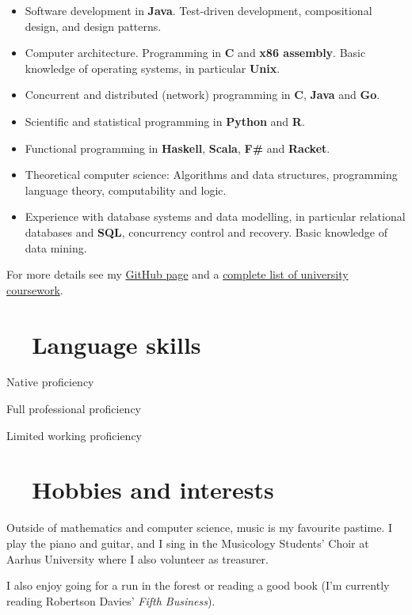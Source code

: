 \documentclass[article, a4paper, 11pt, oneside]{memoir}
\begin{document}
\newcommand{\lan}[1]{\textsf{\textbf{\textcolor{linkcolor}{#1}}}}

\begin{itemize}[itemsep=0em,label={\faAngleDoubleRight}]
    \item Software development in \lan{Java}. Test-driven development, compositional design, and design patterns.
    
    \item Computer architecture. Programming in \lan{C} and \lan{x86 assembly}. Basic knowledge of operating systems, in particular \lan{Unix}.
    
    \item Concurrent and distributed (network) programming in \lan{C}, \lan{Java} and \lan{Go}.

    \item Scientific and statistical programming in \lan{Python} and \lan{R}.
    
    \item Functional programming in \lan{Haskell}, \lan{Scala}, \lan{F\#} and \lan{Racket}.
    
    \item Theoretical computer science: Algorithms and data structures, programming language theory, computability and logic.
    
    \item Experience with database systems and data modelling, in particular relational databases and \lan{SQL}, concurrency control and recovery. Basic knowledge of data mining.
\end{itemize}
%
For more details see my \href{https://github.com/dnhansen/}{GitHub page} and a \href{https://dnhansen.github.io/coursework}{complete list of university coursework}.


\section[Language skills]{\faBook~~Language skills}

\begin{description}[itemsep=0pt]
    \item[Danish] Native proficiency
    \item[English] Full professional proficiency
    \item[German] Limited working proficiency
\end{description}


\section[Hobbies and interests]{\faMusic~~Hobbies and interests}

Outside of mathematics and computer science, music is my favourite pastime. I play the piano and guitar, and I sing in the Musicology Students' Choir at Aarhus University where I also volunteer as treasurer.

I also enjoy going for a run in the forest or reading a good book (I'm currently reading Robertson Davies' \emph{Fifth Business}).
\end{document}
